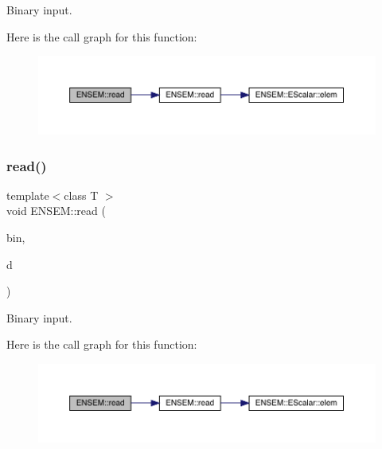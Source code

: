 Binary input. 

Here is the call graph for this function\+:\nopagebreak
\begin{figure}[H]
\begin{center}
\leavevmode
\includegraphics[width=350pt]{d2/d94/namespaceENSEM_a263669f863c2a53acb71cfc540a21e0f_cgraph}
\end{center}
\end{figure}
\mbox{\label{namespaceENSEM_afa38ef41983bd01a166feaa53c5b420d}} 
\subsubsection{\texorpdfstring{read()}{read()}\hspace{0.1cm}{\footnotesize\ttfamily [7/11]}}
{\footnotesize\ttfamily template$<$class T $>$ \\
void E\+N\+S\+E\+M\+::read (\begin{DoxyParamCaption}\item[{\mbox{\hyperlink{classADATIO_1_1BinaryReader}{A\+D\+A\+T\+I\+O\+::\+Binary\+Reader}} \&}]{bin,  }\item[{\mbox{\hyperlink{classENSEM_1_1EScalar}{E\+Scalar}}$<$ \mbox{\hyperlink{classENSEM_1_1OTensor}{O\+Tensor}}$<$ T $>$ $>$ \&}]{d }\end{DoxyParamCaption})\hspace{0.3cm}{\ttfamily [inline]}}



Binary input. 

Here is the call graph for this function\+:\nopagebreak
\begin{figure}[H]
\begin{center}
\leavevmode
\includegraphics[width=350pt]{d2/d94/namespaceENSEM_afa38ef41983bd01a166feaa53c5b420d_cgraph}
\end{center}
\end{figure}
\mbox{\label{namespaceENSEM_a6dcfc9e12db208a46499969e1cc0088d}} 

